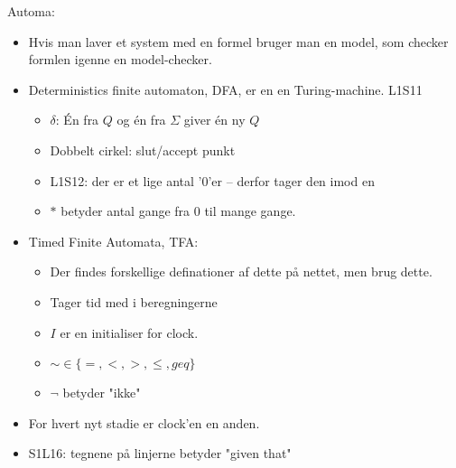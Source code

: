 \documentclass[oneside, 10pt]{article}
\begin{document}
Automa:
\begin{itemize}
	\item Hvis man laver et system med en formel bruger man en model, som checker formlen igenne en model-checker.
	\item Deterministics finite automaton, DFA, er en en Turing-machine. L1S11
	\begin{itemize}
		\item $\delta$: Én fra $Q$ og én fra $\Sigma$ giver én ny $Q$
		\item Dobbelt cirkel: slut/accept punkt
		\item L1S12: der er et lige antal '0'er -- derfor tager den imod en 
		\item $*$ betyder antal gange fra 0 til mange gange.
	\end{itemize}

	\item Timed Finite Automata, TFA:
	\begin{itemize}
		\item Der findes forskellige definationer af dette på nettet, men brug dette.
		\item Tager tid med i beregningerne
		\item $I$ er en initialiser for clock.
		\item $\sim \in \{ =, <, >, \leq, geq\}$
		\item $\neg$ betyder "ikke"
	\end{itemize}

	\item For hvert nyt stadie er clock'en en anden.
	\item S1L16: tegnene på linjerne betyder "given that"

\end{itemize}
\end{document}
